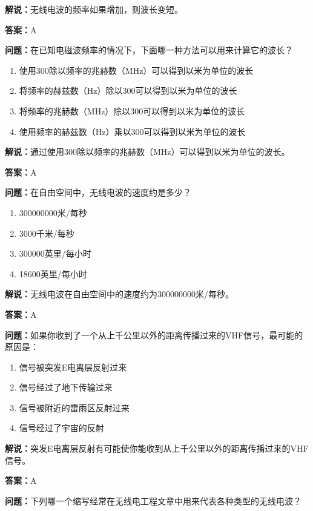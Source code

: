 \documentclass[UTF8]{ctexbook}
\begin{document}
\textbf{解说：}无线电波的频率如果增加，则波长变短。

\textbf{答案：}A

\textbf{问题：}在已知电磁波频率的情况下，下面哪一种方法可以用来计算它的波长？

\begin{enumerate}[label=\Alph*), leftmargin=3em]
  \item 使用300除以频率的兆赫数（MHz）可以得到以米为单位的波长
  \item 将频率的赫兹数（Hz）除以300可以得到以米为单位的波长
  \item 将频率的兆赫数（MHz）除以300可以得到以米为单位的波长
  \item 使用频率的赫兹数（Hz）乘以300可以得到以米为单位的波长
\end{enumerate}

\textbf{解说：}通过使用300除以频率的兆赫数（MHz）可以得到以米为单位的波长。

\textbf{答案：}A

\textbf{问题：}在自由空间中，无线电波的速度约是多少？

\begin{enumerate}[label=\Alph*), leftmargin=3em]
  \item 300000000米/每秒
  \item 3000千米/每秒
  \item 300000英里/每小时
  \item 18600英里/每小时
\end{enumerate}

\textbf{解说：}无线电波在自由空间中的速度约为300000000米/每秒。

\textbf{答案：}A

\textbf{问题：}如果你收到了一个从上千公里以外的距离传播过来的VHF信号，最可能的原因是：

\begin{enumerate}[label=\Alph*), leftmargin=3em]
  \item 信号被突发E电离层反射过来
  \item 信号经过了地下传输过来
  \item 信号被附近的雷雨区反射过来
  \item 信号经过了宇宙的反射
\end{enumerate}

\textbf{解说：}突发E电离层反射有可能使你能收到从上千公里以外的距离传播过来的VHF信号。

\textbf{答案：}A

\textbf{问题：}下列哪一个缩写经常在无线电工程文章中用来代表各种类型的无线电波？
\end{document}
